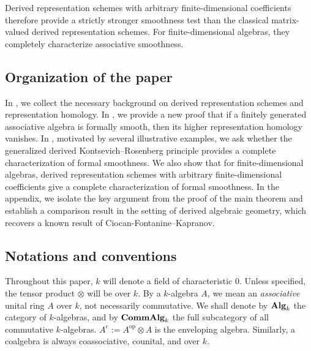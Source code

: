 \documentclass{article}
\numberwithin{equation}{section} %
\theoremstyle{plain}
\theoremstyle{definition}
\theoremstyle{remark}
\begin{document}
Derived representation schemes with arbitrary finite-dimensional coefficients therefore provide a strictly stronger smoothness test than the classical matrix-valued derived representation schemes.
For finite-dimensional algebras, they completely characterize associative smoothness.

\subsection{Organization of the paper}

In , we collect the necessary background on derived representation schemes and representation homology.
In , we provide a new proof that if a finitely generated associative algebra is formally smooth, then its higher representation homology vanishes.
In , motivated by several illustrative examples, we  ask whether the generalized derived Kontsevich–Rosenberg principle provides a complete characterization of formal smoothness.
We also show that for finite-dimensional algebras, derived representation schemes with arbitrary finite-dimensional coefficients give a complete characterization of formal smoothness.
In the appendix, we isolate the key argument from the proof of the main theorem and establish a comparison result in the setting of derived algebraic geometry, which recovers a known result of Ciocan-Fontanine--Kapranov.

\subsection{Notations and conventions}

Throughout this paper, $k$ will denote a field of characteristic $0$. Unless specified, the tensor product $\otimes$ will be over $k$.
By a $k$-algebra $A$, we mean an \emph{associative} unital ring $A$ over $k$, not necessarily commutative.
We shall denote by ${\bf Alg}_k$ the category of $k$-algebras, and by ${\bf CommAlg}_k$ the full subcategory of all commutative $k$-algebras.
$A^e:=A^{\mathrm{op}}\otimes A$ is the enveloping algebra.
Similarly, a coalgebra is always coassociative, counital, and over $k$.
\end{document}
